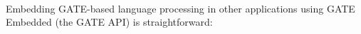 %
%
%


\nnormalsize



\mbox{ }

Embedding GATE-based language processing in other applications using GATE
Embedded (the GATE API) is straightforward:


